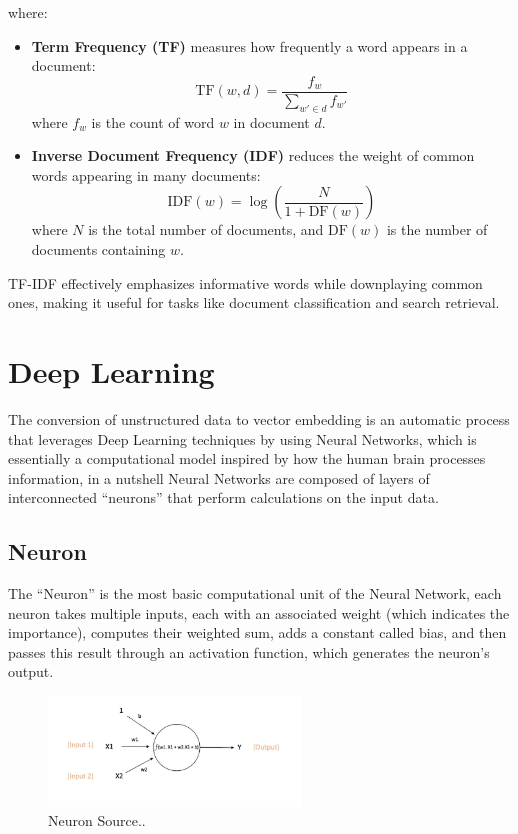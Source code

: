 where:
\begin{itemize}
    \item \textbf{Term Frequency (TF)} measures how frequently a word appears in a document:
    \begin{equation}
        \text{TF}(w, d) = \frac{f_w}{\sum_{w' \in d} f_{w'}}
    \end{equation}
    where \( f_w \) is the count of word \( w \) in document \( d \).

    \item \textbf{Inverse Document Frequency (IDF)} reduces the weight of common words appearing in many documents:
    \begin{equation}
        \text{IDF}(w) = \log \left( \frac{N}{1 + \text{DF}(w)} \right)
    \end{equation}
    where \( N \) is the total number of documents, and \( \text{DF}(w) \) is the number of documents containing \( w \).
\end{itemize}

TF-IDF effectively emphasizes informative words while downplaying common ones, making it useful for tasks like document classification and search retrieval.

\section{Deep Learning}
The conversion of unstructured data to vector embedding is an automatic process that leverages Deep Learning techniques by using Neural Networks, which is essentially a computational model inspired by how the human brain processes information, in a nutshell Neural Networks are composed of layers of interconnected “neurons” that perform calculations on the input data.

\subsection{Neuron}
The “Neuron” is the most basic computational unit of the Neural Network, each neuron takes multiple inputs, each with an associated weight (which indicates the importance), computes their weighted sum, adds a constant called bias, and then passes this result through an activation function, which generates the neuron's output.
\begin{figure}[h]
    \centering
    \includegraphics[width=0.6\textwidth]{IMAGES/immagine_2025-02-26_153339240.png}
    \caption[Neuron]{Neuron Source.\footnotemark.}
    \label{fig:Neuron}
\end{figure}

